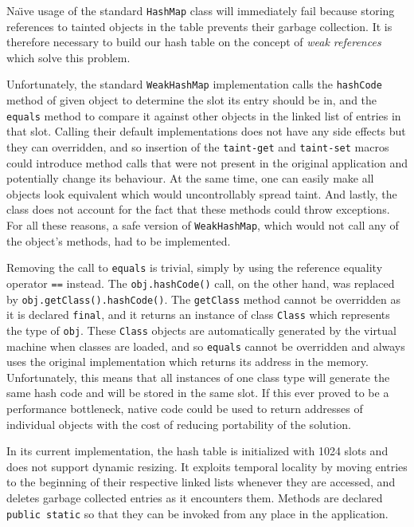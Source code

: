 \documentclass[12pt,twoside,notitlepage]{report}
\begin{document}
Na\"{\i}ve usage of the standard \verb$HashMap$ class will immediately fail because storing references to tainted objects in the table prevents their garbage collection. It is therefore necessary to build our hash table on the concept of \emph{weak references} which solve this problem. 

Unfortunately, the standard \verb$WeakHashMap$ implementation calls the \verb$hashCode$ method of given object to determine the slot its entry should be in, and the \verb$equals$ method to compare it against other objects in the linked list of entries in that slot. Calling their default implementations does not have any side effects but they can overridden, and so insertion of the \verb$taint-get$ and \verb$taint-set$ macros could introduce method calls that were not present in the original application and potentially change its behaviour. At the same time, one can easily make all objects look equivalent which would uncontrollably spread taint. And lastly, the class does not account for the fact that these methods could throw exceptions. For all these reasons, a safe version of \verb$WeakHashMap$, which would not call any of the object's methods, had to be implemented. 

Removing the call to \verb$equals$ is trivial, simply by using the reference equality operator \verb$==$ instead. The \verb$obj.hashCode()$ call, on the other hand, was replaced by \verb$obj.getClass().hashCode()$. The \verb$getClass$ method cannot be overridden as it is declared \verb$final$, and it returns an instance of class \verb$Class$ which represents the type of \verb$obj$. These \verb$Class$ objects are automatically generated by the virtual machine when classes are loaded, and so \verb$equals$ cannot be overridden and always uses the original implementation which returns its address in the memory. Unfortunately, this means that all instances of one class type will generate the same hash code and will be stored in the same slot. If this ever proved to be a performance bottleneck, native code could be used to return addresses of individual objects with the cost of reducing portability of the solution. 

In its current implementation, the hash table is initialized with 1024 slots and does not support dynamic resizing. It exploits temporal locality by moving entries to the beginning of their respective linked lists whenever they are accessed, and deletes garbage collected entries as it encounters them. Methods are declared \verb$public static$ so that they can be invoked from any place in the application.
\end{document}
